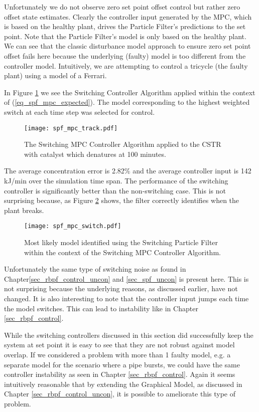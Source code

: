 Unfortunately we do not observe zero set point offset control but rather zero offset state estimates. Clearly the controller input generated by the MPC, which is based on the healthy plant, drives the Particle Filter's predictions to the set point. Note that the Particle Filter's model is only based on the healthy plant. We can see that the classic disturbance model approach \cite{lee} to ensure zero set point offset fails here because the underlying (faulty) model is too different from the controller model. Intuitively, we are attempting to control a tricycle (the faulty plant) using a model of a Ferrari.  

In Figure \ref{fig_spf_mpc_track} we see the Switching Controller Algorithm applied within the context of (\ref{eq_spf_mpc_expected}). The model corresponding to the highest weighted switch at each time step was selected for control.
\begin{figure}[H] 
\centering
\texttt{[image: spf\_mpc\_track.pdf]}
\caption{The Switching MPC Controller Algorithm applied to the CSTR with catalyst which denatures at 100 minutes.}
\label{fig_spf_mpc_track}
\end{figure}
The average concentration error is 2.82\% and the average controller input is 142 kJ/min over the simulation time span. The performance of the switching controller is significantly better than the non-switching case. This is not surprising because, as Figure \ref{fig_spf_mpc_switch} shows, the filter correctly identifies when the plant breaks.
\begin{figure}[H] 
\centering
\texttt{[image: spf\_mpc\_switch.pdf]}
\caption{Most likely model identified using the Switching Particle Filter within the context of the Switching MPC Controller Algorithm.}
\label{fig_spf_mpc_switch}
\end{figure}
Unfortunately the same type of switching noise as found in Chapter\ref{sec_rbpf_control_uncon} and \ref{sec_spf_uncon} is present here. This is not surprising because the underlying reasons, as discussed earlier, have not changed. It is also interesting to note that the controller input jumps each time the model switches. This can lead to instability like in Chapter \ref{sec_rbpf_control}.

While the switching controllers discussed in this section did successfully keep the system at set point it is easy to see that they are not robust against model overlap. If we considered a problem with more than 1 faulty model, e.g. a separate model for the scenario where a pipe bursts, we could have the same controller instability as seen in Chapter \ref{sec_rbpf_control}. Again it seems intuitively reasonable that by extending the Graphical Model, as discussed in Chapter \ref{sec_rbpf_control_uncon}, it is possible to ameliorate this type of problem.   

